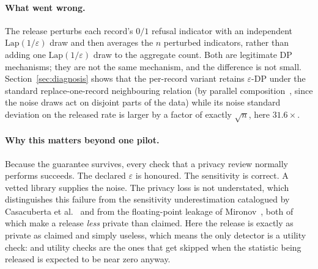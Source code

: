 \documentclass[journal]{IEEEtran}
\theoremstyle{definition}
\newcommand{\Inflation}{31.6}
\begin{document}
\paragraph{What went wrong.}
The release perturbs each record's $0/1$ refusal indicator with an independent
$\mathrm{Lap}(1/\varepsilon)$ draw and then averages the $n$ perturbed
indicators, rather than adding one $\mathrm{Lap}(1/\varepsilon)$ draw to the
aggregate count. Both are legitimate DP mechanisms; they are not the same
mechanism, and the difference is not small. Section~\ref{sec:diagnosis} shows
that the per-record variant retains $\varepsilon$-DP under the standard
replace-one-record neighbouring relation (by parallel
composition~\cite{mcsherry2009pinq}, since the noise draws act on disjoint parts
of the data) while its noise standard deviation on the released rate is larger
by a factor of exactly $\sqrt{n}$, here $\Inflation\times$.

\paragraph{Why this matters beyond one pilot.}
Because the guarantee survives, every check that a privacy review normally
performs succeeds. The declared $\varepsilon$ is honoured. The sensitivity is
correct. A vetted library supplies the noise. The privacy loss is not
understated, which distinguishes this failure from the sensitivity
underestimation catalogued by Casacuberta et al.~\cite{casacuberta2022sensitivity}
and from the floating-point leakage of Mironov~\cite{mironov2012lsb}, both of
which make a release \emph{less} private than claimed. Here the release is
exactly as private as claimed and simply useless, which means the only detector
is a utility check: and utility checks are the ones that get skipped when the
statistic being released is expected to be near zero anyway.
\end{document}
